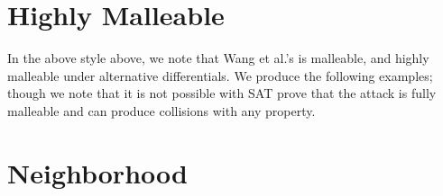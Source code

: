 \documentclass[letterpaper,twocolumn,10pt]{article}
\begin{document}
\section{Highly Malleable}
In the above style above, we note that Wang et al.'s is malleable, and highly
malleable under alternative differentials. We produce the following examples;
though we note that it is not possible with SAT prove that the attack is
fully malleable and can produce collisions with any property.


\section{Neighborhood}



{\footnotesize 

}


\end{document}
